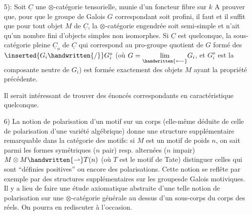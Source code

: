 

5): Soit $\underline{C}$ une $\otimes$-catégorie tensorielle,  munie d'un foncteur fibre sur $k$  A prouver que, pour que le groupe de Galois $G$ correspondant soit profini, il faut et il suffit que pour tout objet $M$ de $\underline{C}$, la $\otimes$-catégorie engendrée soit semi-simple et n'ait qu'un nombre fini d'objects simples non isomorphes. Si $\underline{C}$ est quelconque, la sous-catégorie pleine  $\underline{C}_o$ de $\underline{C}$ qui correspond au pro-groupe quotient de $G$ formé des $\inserted{G_i\handwritten{/}}G_i^o$ (où $G=\underset{\handwritten{\longleftarrow}}{\lim}G_i$, et $G_i^o$ est la composante neutre de $G_i$) est formée exactement des objets $M$ ayant la propriété précédente.

Il serait intéressant de trouver des énoncés correspondants en caractéristique quelconque.

6) La notion de polarisation d'un motif sur un corps (elle-même déduite de celle de polarisation d'une variété algébrique) donne une structure supplémentaire remarquable dans la catégorie des motifs: si $M$ est un motif de poids $n$, on sait parmi les formes symétriques ($n$ pair) resp. alternées ($n$ impair) $M\otimes M\handwritten{\rightharpoonup} T(n)$ (où $T$ est le motif de Tate) distinguer celles qui sont ``définies positives'' ou encore des polarisations. Cette notion se reflête par exemple par des structures supplémentaires sur les groupesde Galois motiviques. Il y a lieu de faire une étude axiomatique abstraite d'une telle notion de polarisation sur une $\otimes$-catégorie générale au dessus d'un  sous-corps du corps des réels. On pourra en rediscuter à l'occasion.

